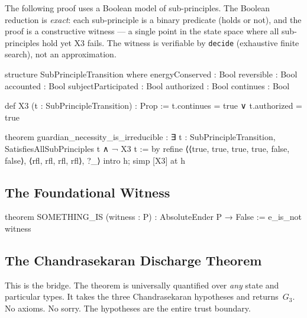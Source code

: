 \documentclass[11pt,a4paper]{article}
\theoremstyle{definition}
\theoremstyle{remark}
\begin{document}
The following proof uses a Boolean model of sub-principles. The Boolean reduction is \emph{exact}: each sub-principle is a binary predicate (holds or not), and the proof is a constructive witness --- a single point in the state space where all sub-principles hold yet X3 fails. The witness is verifiable by \texttt{decide} (exhaustive finite search), not an approximation.

\begin{leancode}
structure SubPrincipleTransition where
  energyConserved : Bool
  reversible : Bool
  accounted : Bool
  subjectParticipated : Bool
  authorized : Bool
  continues : Bool

def X3 (t : SubPrincipleTransition) : Prop :=
  t.continues = true ∨ t.authorized = true

theorem guardian_necessity_is_irreducible :
    ∃ t : SubPrincipleTransition,
      SatisfiesAllSubPrinciples t ∧ ¬ X3 t := by
  refine ⟨⟨true, true, true, true, false, false⟩,
         ⟨rfl, rfl, rfl, rfl⟩, ?_⟩
  intro h; simp [X3] at h
\end{leancode}

\subsection{The Foundational Witness}

\begin{leancode}
theorem SOMETHING_IS (witness : P) : AbsoluteEnder P → False :=
  e_is_not witness
\end{leancode}

\subsection{The Chandrasekaran Discharge Theorem}\label{sec:bridge}

This is the bridge. The theorem is universally quantified over \emph{any} state and particular types. It takes the three Chandrasekaran hypotheses and returns~$G_3$. No axioms. No sorry. The hypotheses are the entire trust boundary.
\end{document}

